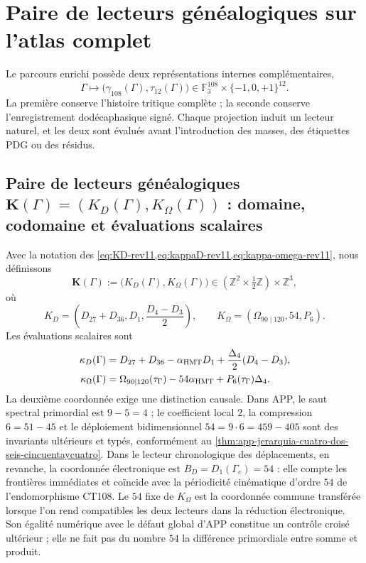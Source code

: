 \section{Paire de lecteurs généalogiques sur l'atlas complet}
\label{sec:operadores-masa-two-way-rev11}

Le parcours enrichi possède deux représentations internes complémentaires,
\[
 \Gamma\longmapsto
 \bigl(\gamma_{108}(\Gamma),\tau_{12}(\Gamma)\bigr)
 \in\mathbb F_3^{108}\times\{-1,0,+1\}^{12}.
\]
La première conserve l'histoire tritique complète ; la seconde conserve
l'enregistrement dodécaphasique signé. Chaque projection induit un lecteur naturel, et les deux
sont évalués avant l'introduction des masses, des étiquettes PDG ou des résidus.

\subsection{Paire de lecteurs généalogiques \(\mathbf K(\Gamma)=(K_D(\Gamma),K_\Omega(\Gamma))\) : domaine, codomaine et évaluations scalaires}

Avec la notation des
\cref{eq:KD-rev11,eq:kappaD-rev11,eq:kappa-omega-rev11}, nous définissons
\begin{equation}
 \mathbf K(\Gamma)
 :=\bigl(K_D(\Gamma),K_\Omega(\Gamma)\bigr)
 \in\left(\mathbb Z^2\times\tfrac12\mathbb Z\right)
 \times\mathbb Z^3,
 \label{eq:lector-conjunto-masas-rev11}
\end{equation}
où
\[
 K_D=\left(D_{27}+D_{36},D_1,\frac{D_4-D_3}{2}\right),
 \qquad
 K_\Omega=(\Omega_{90\mid120},54,P_6).
\]
Les évaluations scalaires sont
\begin{align}
 \kappa_D(\Gamma)
 &=D_{27}+D_{36}-\alpha_{\rm HMT}D_1
 +\frac{\Delta_4}{2}(D_4-D_3),
 \label{eq:kappaD-general-rev11}\\
\kappa_\Omega(\Gamma)
&=\Omega_{90\mid120}(\tau_\Gamma)
-54\alpha_{\rm HMT}+P_6(\tau_\Gamma)\Delta_4.
\label{eq:kappaOmega-general-rev11}
\end{align}
La deuxième coordonnée exige une distinction causale. Dans APP, le saut
spectral primordial est \(9-5=4\) ; le coefficient local \(2\), la compression
\(6=51-45\) et le déploiement bidimensionnel \(54=9\cdot6=459-405\) sont
des invariants ultérieurs et typés, conformément au
\cref{thm:app-jerarquia-cuatro-dos-seis-cincuentaycuatro}. Dans le lecteur
chronologique des déplacements, en revanche, la coordonnée électronique est
\(B_D=D_1(\Gamma_e)=54\) : elle compte les frontières immédiates et coïncide avec la
périodicité cinématique d'ordre \(54\) de l'endomorphisme CT108. Le
\(54\) fixe de
\(K_\Omega\) est la coordonnée commune transférée lorsque l'on rend compatibles les deux
lecteurs dans la réduction électronique. Son égalité numérique avec le défaut
global d'APP constitue un contrôle croisé ultérieur ; elle ne fait pas du
nombre \(54\) la différence primordiale entre somme et produit.


